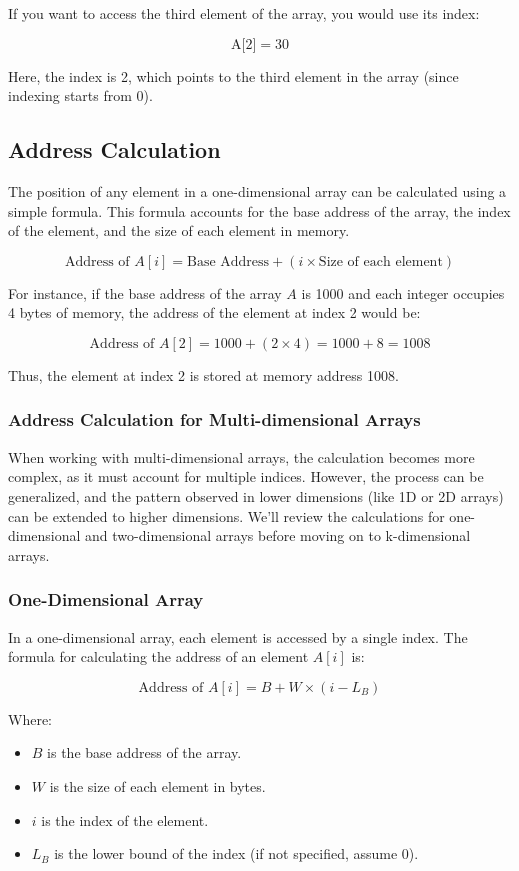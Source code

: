 \documentclass{book}
\begin{document}
	If you want to access the third element of the array, you would use its index:
	
	\[\text{A[2]} = 30\]
	
	Here, the index is 2, which points to the third element in the array (since indexing starts from 0). 
		
\subsection{Address Calculation}

The position of any element in a one-dimensional array can be calculated using a simple formula. This formula accounts for the base address of the array, the index of the element, and the size of each element in memory.

\[
\text{Address of } A[i] = \text{Base Address} + (i \times \text{Size of each element})
\]

For instance, if the base address of the array \( A \) is 1000 and each integer occupies 4 bytes of memory, the address of the element at index 2 would be:

\[
\text{Address of } A[2] = 1000 + (2 \times 4) = 1000 + 8 = 1008
\]

Thus, the element at index 2 is stored at memory address 1008.

\subsubsection{Address Calculation for Multi-dimensional Arrays}

When working with multi-dimensional arrays, the calculation becomes more complex, as it must account for multiple indices. However, the process can be generalized, and the pattern observed in lower dimensions (like 1D or 2D arrays) can be extended to higher dimensions. We'll review the calculations for one-dimensional and two-dimensional arrays before moving on to k-dimensional arrays.

\subsubsection{One-Dimensional Array}

In a one-dimensional array, each element is accessed by a single index. The formula for calculating the address of an element \( A[i] \) is:

\[
\text{Address of } A[i] = B + W \times (i - L_B)
\]

Where:
\begin{itemize}
	\item \( B \) is the base address of the array.
	\item \( W \) is the size of each element in bytes.
	\item \( i \) is the index of the element.
	\item \( L_B \) is the lower bound of the index (if not specified, assume 0).
\end{itemize}
\end{document}
